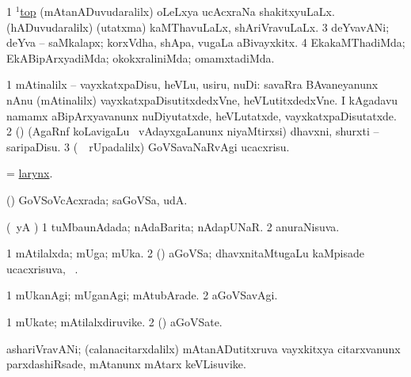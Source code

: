 \noindent 
\gl{\pagu}
\expl{}
\bmng
\bnum
\num{1}  \hyperref{kandict_t.pdf}{T}{top(1)16}{$^1$top}  
  
\banum
{} (mAtanADuvudaralilx) oLeLxya ucAcxraNa shakitxyuLaLx. 
 (hADuvudaralilx) (utatxma) kaMThavuLaLx, shAriVravuLaLx. 
\eanum
\numie
\num{3}  deYvavANi; deYva -- saMkalapx; korxVdha, shApa, \mo vugaLa aBivayxkitx. 
\num{4}  EkakaMThadiMda; EkABipArxyadiMda; okokxraliniMda; omamxtadiMda. 
\enum
\emng
\eentry

\bentry
{} 
\gl{\sakirx}
\expl{}
\bmng
\bnum
\num{1} mAtinalilx -- vayxkatxpaDisu, heVLu, usiru, nuDi:  savaRra BAvaneyanunx nAnu (mAtinalilx) vayxkatxpaDisutitxdedxVne, heVLutitxdedxVne.  I kAgadavu namamx aBipArxyavanunx nuDiyutatxde, heVLutatxde, vayxkatxpaDisutatxde. 
\num{2} (\saM) (AgaRnf koLavigaLu \mo\ vAdayxgaLanunx niyaMtirxsi) dhavxni, shurxti -- saripaDisu. 
\num{3} (\kanmu\ \BUkaq\ rUpadalilx) GoVSavaNaRvAgi ucacxrisu. 
\enum
\emng
\eentry

\bentry 
{} 
\gl{\nA}
\expl{}
\bmng
 = \hyperref{kandict_l.pdf}{L}{larynx}{larynx}. 
\emng
\eentry

\bentry
{} 
\gl{\gu}
\expl{}
\bmng
 (\dhavxni) GoVSoVcAcxrada; saGoVSa, udA.  
\emng
\eentry

\bentry 
{} 
\gl{\gu}
\expl{}
\bmng
 (\kAparx\ yA \alaMshA) 
\bnum
\num{1} tuMbaunAdada; nAdaBarita; nAdapUNaR. 
\num{2} anuraNisuva. 
\enum
\emng
\eentry

\bentry 
{} 
\gl{\gu}
\expl{}
\bmng
\bnum
\num{1} mAtilalxda; mUga; mUka. 
\num{2} (\dhavxni) aGoVSa; dhavxnitaMtugaLu kaMpisade ucacxrisuva, \udA\ . 
\enum
\emng
\eentry

\bentry
{} 
\gl{\kirxvi}
\expl{}
\bmng
\bnum
\num{1} mUkanAgi; mUganAgi; mAtubArade. 
\num{2} aGoVSavAgi. 
\enum
\emng
\eentry

\bentry
{} 
\gl{\nA}
\expl{}
\bmng
\bnum
\num{1} mUkate; mAtilalxdiruvike. 
\num{2} (\dhavxni) aGoVSate. 
\enum
\emng
\eentry

\bentry
{} 
\gl{\nA}
\expl{}
\bmng
 ashariVravANi; (calanacitarxdalilx) mAtanADutitxruva vayxkitxya citarxvanunx parxdashiRsade, mAtanunx mAtarx keVLisuvike. 
\emng
\eentry


